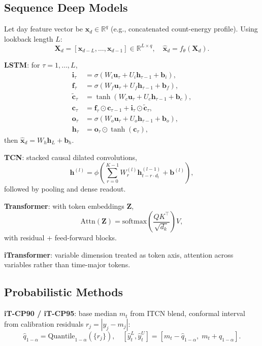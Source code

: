 \documentclass[journal]{IEEEtran}
\newcommand{\R}{\mathbb{R}}
\begin{document}
\subsection{Sequence Deep Models}
Let day feature vector be $\mathbf{x}_d \in \R^{q}$ (e.g., concatenated count-energy profile). Using lookback length $L$:
\begin{equation}
\mathbf{X}_d=[\mathbf{x}_{d-L},\dots,\mathbf{x}_{d-1}] \in \R^{L\times q},
\quad \hat{\mathbf{x}}_d=f_\theta(\mathbf{X}_d).
\end{equation}

\textbf{LSTM}: for $\tau=1,\dots,L$,
\begin{align}
\mathbf{i}_\tau &= \sigma(W_i\mathbf{u}_\tau+U_i\mathbf{h}_{\tau-1}+\mathbf{b}_i),\\
\mathbf{f}_\tau &= \sigma(W_f\mathbf{u}_\tau+U_f\mathbf{h}_{\tau-1}+\mathbf{b}_f),\\
\tilde{\mathbf{c}}_\tau &= \tanh(W_c\mathbf{u}_\tau+U_c\mathbf{h}_{\tau-1}+\mathbf{b}_c),\\
\mathbf{c}_\tau &= \mathbf{f}_\tau\odot\mathbf{c}_{\tau-1}+\mathbf{i}_\tau\odot\tilde{\mathbf{c}}_\tau,\\
\mathbf{o}_\tau &= \sigma(W_o\mathbf{u}_\tau+U_o\mathbf{h}_{\tau-1}+\mathbf{b}_o),\\
\mathbf{h}_\tau &= \mathbf{o}_\tau\odot\tanh(\mathbf{c}_\tau),
\end{align}
then $\hat{\mathbf{x}}_d=W_h\mathbf{h}_L+\mathbf{b}_h$.

\textbf{TCN}: stacked causal dilated convolutions,
\begin{equation}
\mathbf{h}^{(l)} = \phi\left(\sum_{r=0}^{K-1} W^{(l)}_{r}\mathbf{h}^{(l-1)}_{t-r\cdot d_l}+\mathbf{b}^{(l)}\right),
\end{equation}
followed by pooling and dense readout.

\textbf{Transformer}: with token embeddings $\mathbf{Z}$,
\begin{equation}
\mathrm{Attn}(\mathbf{Z})=\mathrm{softmax}\left(\frac{QK^\top}{\sqrt{d_k}}\right)V,
\end{equation}
with residual + feed-forward blocks.

\textbf{iTransformer}: variable dimension treated as token axis, attention across variables rather than time-major tokens.

\subsection{Probabilistic Methods}
\textbf{iT-CP90 / iT-CP95}: base median $m_t$ from ITCN blend, conformal interval from calibration residuals $r_j=|y_j-m_j|$:
\begin{equation}
\hat{q}_{1-\alpha}=\mathrm{Quantile}_{1-\alpha}(\{r_j\}),
\quad [\hat{y}^{L}_t,\hat{y}^{U}_t]=[m_t-\hat{q}_{1-\alpha},\;m_t+\hat{q}_{1-\alpha}].
\end{equation}
\end{document}
